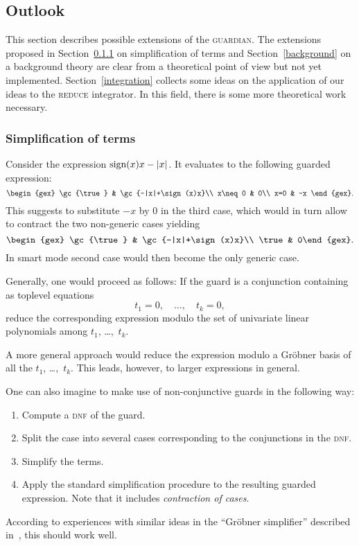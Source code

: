\subsection{Outlook}
This section describes possible extensions of the \textsc{guardian}. The
extensions proposed in Section~\ref{simplification} on simplification
of terms and Section~\ref{background} on a background theory are clear
from a theoretical point of view but not yet implemented.
Section~\ref{integration} collects some ideas on the application of
our ideas to the \textsc{reduce} integrator. In this field, there is some
more theoretical work necessary.
%
\subsubsection{Simplification of terms}\label{simplification}
Consider the expression $\textrm{sign}(x)x-|x|$. It evaluates to the following
guarded expression:
\[
\begin{gex}
\gc{\true} & \gc{-|x|+\sign(x)x}\\
x\neq 0 & 0\\
x=0 & -x
\end{gex}.
\]
This suggests to substitute $-x$ by $0$ in the third case, which would
in turn allow to contract the two non-generic cases yielding
\[
\begin{gex}
\gc{\true} & \gc{-|x|+\sign(x)x}\\
\true & 0\end{gex}.
\]
In smart mode second case would then become the only generic case.

Generally, one would proceed as follows: If the guard is a conjunction
containing as toplevel equations
\[
t_1=0,\quad \dots,\quad t_k=0,
\]
reduce the corresponding expression modulo the set of univariate
linear polynomials among $t_1$, \dots,~$t_k$.

A more general approach would reduce the expression modulo a Gr\"obner
basis of all the $t_1$, \dots,~$t_k$. This leads, however, to larger
expressions in general.

One can also imagine to make use of non-conjunctive guards in the
following way:
\begin{enumerate}
\item Compute a \textsc{dnf} of the guard.
\item Split the case into several cases corresponding to the
conjunctions in the \textsc{dnf}.
\item Simplify the terms.
\item Apply the standard simplification procedure to the resulting
guarded expression. Note that it includes {\em contraction of cases}.
\end{enumerate}
According to experiences with similar ideas in the ``Gr\"obner
simplifier'' described in~\cite{Dolzmann:97b}, this should work
well.
%
